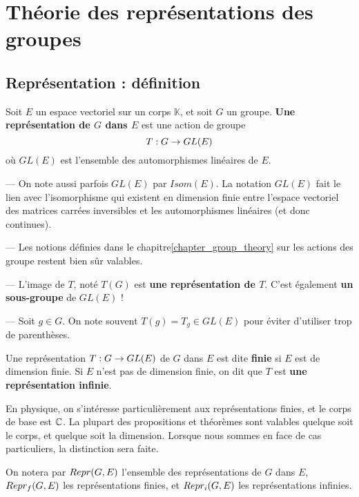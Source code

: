 \chapter{Théorie des représentations des groupes}

\section{Représentation : définition}
\begin{definition}
	Soit $E$ un espace vectoriel sur un corps $\mathbb{K}$, et soit $G$ un groupe.
	\textbf{Une représentation de $G$ dans $E$} est une action de groupe
	\begin{equation}
		T : G \rightarrow GL(E)
		\label{definition_representation}
	\end{equation}
	où $GL(E)$ est l'ensemble des automorphismes linéaires de $E$.
\end{definition}

\begin{remarque}
	--- On note aussi parfois $GL(E)$ par $Isom(E)$. La notation $GL(E)$ fait le
	lien avec l'isomorphisme qui existent en dimension finie entre l'espace
	vectoriel des matrices carrées inversibles et les automorphismes linéaires
	(et donc continues).

	--- Les notions définies dans le chapitre\ref{chapter_group_theory} sur les
	actions des groupe restent bien sûr valables.

	--- L'image de $T$, noté $T(G)$ est \textbf{une représentation de $T$}.
	C'est également \textbf{un sous-groupe} de $GL(E)$ !

	--- Soit $g \in G$. On note souvent $T(g) = T_{g} \in GL(E)$ pour éviter
	d'utiliser trop de parenthèses.
\end{remarque}

\begin{definition}
	Une représentation $T : G \rightarrow GL(E)$ de $G$ dans $E$ est dite
	\textbf{finie} si $E$ est de dimension finie. Si $E$ n'est pas de dimension
	finie, on dit que $T$ est \textbf{une représentation infinie}.
\end{definition}

En physique, on s'intéresse particulièrement aux représentations finies, et le
corps de base est $\mathbb{C}$. La plupart des propositions et théorèmes sont
valables quelque soit le corps, et quelque soit la dimension.
Lorsque nous sommes en face de cas particuliers, la distinction sera faite.

On notera par $Repr(G, E)$ l'ensemble des représentations de $G$ dans $E$,
$Repr_{f}(G, E)$ les représentations finies, et $Repr_{i}(G, E)$ les
représentations infinies.

